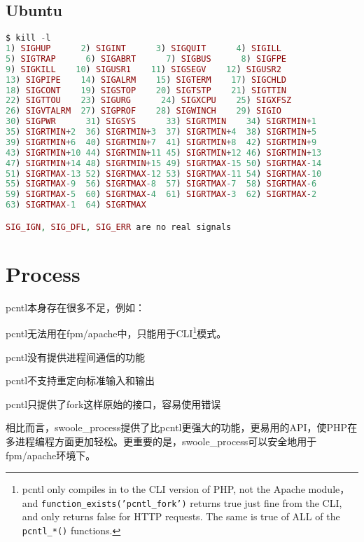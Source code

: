\subsection{Ubuntu}


\begin{lstlisting}[language=PHP]
$ kill -l
1) SIGHUP      2) SIGINT      3) SIGQUIT      4) SIGILL
5) SIGTRAP      6) SIGABRT      7) SIGBUS      8) SIGFPE
9) SIGKILL    10) SIGUSR1    11) SIGSEGV    12) SIGUSR2
13) SIGPIPE    14) SIGALRM    15) SIGTERM    17) SIGCHLD
18) SIGCONT    19) SIGSTOP    20) SIGTSTP    21) SIGTTIN
22) SIGTTOU    23) SIGURG      24) SIGXCPU    25) SIGXFSZ
26) SIGVTALRM  27) SIGPROF    28) SIGWINCH    29) SIGIO
30) SIGPWR      31) SIGSYS      33) SIGRTMIN    34) SIGRTMIN+1
35) SIGRTMIN+2  36) SIGRTMIN+3  37) SIGRTMIN+4  38) SIGRTMIN+5
39) SIGRTMIN+6  40) SIGRTMIN+7  41) SIGRTMIN+8  42) SIGRTMIN+9
43) SIGRTMIN+10 44) SIGRTMIN+11 45) SIGRTMIN+12 46) SIGRTMIN+13
47) SIGRTMIN+14 48) SIGRTMIN+15 49) SIGRTMAX-15 50) SIGRTMAX-14
51) SIGRTMAX-13 52) SIGRTMAX-12 53) SIGRTMAX-11 54) SIGRTMAX-10
55) SIGRTMAX-9  56) SIGRTMAX-8  57) SIGRTMAX-7  58) SIGRTMAX-6
59) SIGRTMAX-5  60) SIGRTMAX-4  61) SIGRTMAX-3  62) SIGRTMAX-2
63) SIGRTMAX-1  64) SIGRTMAX

SIG_IGN, SIG_DFL, SIG_ERR are no real signals
\end{lstlisting}


\section{Process}


pcntl本身存在很多不足，例如：

\begin{compactitem}
\item pcntl无法用在fpm/apache中，只能用于CLI\footnote{pcntl only compiles in to the CLI version of PHP, not the Apache module，and \texttt{function\_exists('pcntl\_fork')} returns true just fine from the CLI, and only returns false for HTTP requests. The same is true of ALL of the \texttt{pcntl\_*()} functions.}模式。

\item pcntl没有提供进程间通信的功能
\item pcntl不支持重定向标准输入和输出
\item pcntl只提供了fork这样原始的接口，容易使用错误
\end{compactitem}

相比而言，swoole\_process提供了比pcntl更强大的功能，更易用的API，使PHP在多进程编程方面更加轻松。更重要的是，swoole\_process可以安全地用于fpm/apache环境下。


